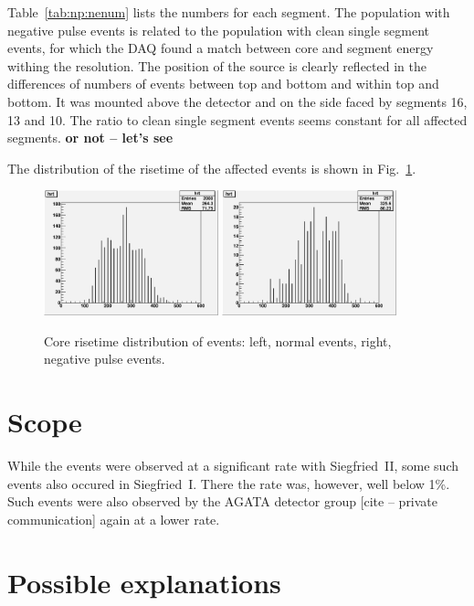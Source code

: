 Table~\ref{tab:np:nenum} lists the numbers for each segment. The
population with negative pulse events is related to the population
with clean single segment events, for which the DAQ found a match
between core and segment energy withing the resolution. The position
of the source is clearly reflected in the differences of numbers of
events between top and bottom and within top and bottom. It was
mounted above the detector and on the side faced by segments 16, 13
and 10.  The ratio to clean single segment events seems constant for
all affected segments.  {\bf or not -- let's see }

The distribution of the risetime of the affected events is shown in
Fig.~\ref{fig:np:nert}. 

\begin{figure}[tphb]
\centering
\includegraphics[width=0.45\textwidth]{RTnor}
\includegraphics[width=0.45\textwidth]{RTneg}
\caption{Core risetime distribution of events: left, normal events,
right, negative pulse events.}
\label{fig:np:nert}
\end{figure}

\section{Scope}
\label{sec:np:scope}

While the events were observed at a significant rate with
Siegfried~II, some such events also occured in Siegfried~I. There the
rate was, however, well below 1\%. Such events were also observed by
the AGATA detector group [cite -- private communication] again at a
lower rate.

\section{Possible explanations}
\label{sec:np:exp}

